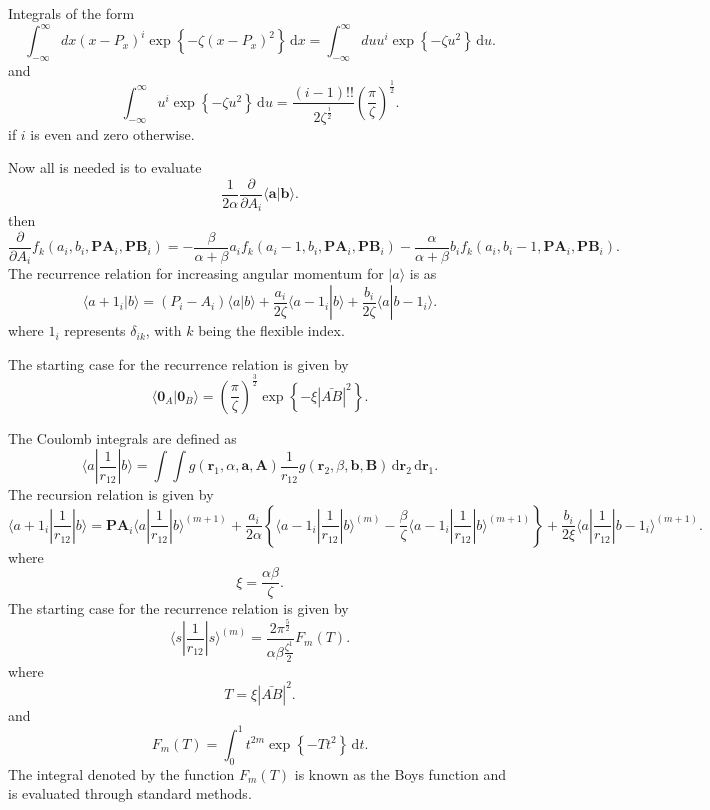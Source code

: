 Integrals of the form
\[
	\int ^\infty _{-\infty} dx (x-P_x)^i \exp \left\{ - \zeta (x-P_x)^2 \right\}  \, \mathrm{d}x = \int ^\infty_{-\infty} du u^i \exp \left\{ - \zeta u^2 \right\} \, \mathrm{d} u 
.\] 
and 
\[
	\int ^\infty_{-\infty}  u^i \exp \left\{ -\zeta u^2 \right\} \, \mathrm{d}u = \frac{(i-1)!!}{2\zeta^{\frac{i}{2}} }\left( \frac{\pi}{\zeta} \right) ^{\frac{1}{2}} 
.\] 
if $i$ is even and zero otherwise. 

Now all  is needed is to evaluate
\[
\frac{1}{2\alpha} \frac{\partial }{\partial A_i}  \langle \boldsymbol{a} | \boldsymbol{b} \rangle 
.\] 
then
\[
	\frac{\partial }{\partial A_i} f_k (a_i,b_i,\boldsymbol{PA}_i, \boldsymbol{PB}_i) = - \frac{\beta}{\alpha+\beta} a_i f_k (a_i-1,b_i,\boldsymbol{PA}_i,\boldsymbol{PB}_i) - \frac{\alpha}{\alpha + \beta} b_i f_k (a_i, b_i -1 , \boldsymbol{PA}_i,\boldsymbol{PB}_i)
.\] 
The recurrence relation for increasing angular momentum for $| a \rangle $ is as
\[
	\langle a+1_i | b \rangle = (P_i - A_i) \langle a | b \rangle + \frac{a_i}{2 \zeta} \langle a- 1_i | b \rangle + \frac{b_i}{2\zeta} \langle a | b-1_i \rangle 
.\] 
where $1_i$ represents  $\delta_{ik}$, with $k$ being the flexible index.

The starting case for the recurrence relation is given by
\[
	\langle \boldsymbol{0}_A | \boldsymbol{0}_B \rangle = \left( \frac{\pi}{\zeta} \right) ^{\frac{3}{2}} \exp \left\{ - \xi | \bar{AB} | ^2 \right\} 
.\] 

The Coulomb integrals are defined as
\[
	\langle a | \frac{1}{r_{12}} | b \rangle = \int \int g(\boldsymbol{r}_1,\alpha,\boldsymbol{a},\boldsymbol{A}) \frac{1}{r_{12}} g(\boldsymbol{r}_2,\beta, \boldsymbol{b},\boldsymbol{B}) \, \mathrm{d}\boldsymbol{r}_2  \, \mathrm{d} \boldsymbol{r}_1 
.\] 
The recursion relation is given by
\[
	\langle a + 1_i | \frac{1}{r_{12}} | b \rangle = \boldsymbol{PA}_i \langle a | \frac{1}{r_{12}} | b \rangle ^{(m+1)} + \frac{a_i}{2\alpha} \left\{ \langle a-1_i | \frac{1}{r_{12}} | b \rangle ^{(m)} - \frac{\beta}{\zeta}\langle a - 1_i | \frac{1}{r_{12}} | b \rangle ^{(m+1)}\right\} + \frac{b_i}{2\xi} \langle a | \frac{1}{r_{12}} | b - 1_i \rangle ^{(m+1)} 
.\] 
where
\[
\xi = \frac{\alpha \beta}{\zeta}
.\] 
The starting case for the recurrence relation is given by
\[
	\langle s | \frac{1}{r_{12}} | s \rangle ^{(m)} = \frac{2\pi ^{\frac{5}{2}}}{\alpha \beta \frac{\zeta^1}{2}} F_m(T)
.\] 
where
\[
	T = \xi |\bar{AB} | ^2
.\] 
and 
\[
	F_m (T) = \int ^1_0 t^{2m} \exp \left\{ - T t^2 \right\}  \, \mathrm{d}t 
.\] 
The integral denoted by the function $F_m(T)$ is known as the Boys function and is evaluated through standard methods.



